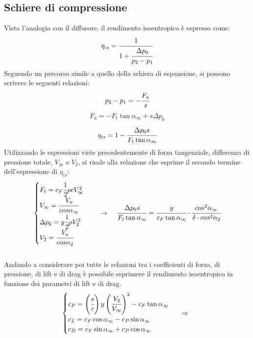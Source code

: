 \subsection{Schiere di compressione}
Vista l'analogia con il diffusore, il rendimento isoentropico è espresso come:
\begin{align*}
\eta_{is} = \cfrac{1}{1 + \cfrac{\Delta p_0}{p_2-p_1}}
\end{align*}
Seguendo un percorso simile a quello della schiera di espansione, si possono scrivere le seguenti relazioni:
\begin{align*}
p_2-p_1 = -\cfrac{F_a}{s}
\end{align*}
\begin{align*}
F_a = -F_t \tan \alpha_{\infty} + s \Delta p_0
\end{align*}
\begin{align*}
\eta_{is} = 1- \cfrac{\Delta p_0 s}{F_t \tan \alpha_{\infty}}
\end{align*}
Utilizzando le espressioni viste precedentemente di forza tangenziale, differenza di pressione totale, $V_\infty$ e $V_2$, si risale alla relazione che esprime il secondo termine dell'espressione di $\eta_{is}$:
\begin{align*}
\begin{cases}
F_t = c_F \cfrac{1}{2} \rho c V_{\infty}^2\\
V_{\infty} = \cfrac{V_a}{cos \alpha_{\infty}}\\
\Delta p_0 = y \cfrac{1}{2} \rho V_2^2\\
V_2 = \cfrac{V_a}{cos \alpha_2}
\end{cases}
\;\;\;\; \rightarrow \;\;\;\;
\cfrac{\Delta p_0 s}{F_t \tan \alpha_{\infty}} = \cfrac{y}{c_F \tan \alpha_{\infty}} \cdot \cfrac{cos^2 \alpha_{\infty}}{\delta \cdot cos^2 \alpha_2}
\end{align*}
\\Andando a considerare poi tutte le relazioni tra i coefficienti di forza, di pressione, di lift e di drag è possibile esprimere il rendimento isoentropico in funzione dei parametri di lift e di drag.
\begin{align*}
\begin{cases}
c_P = \left(  \cfrac{s}{c} \right) y \left( \cfrac{V_2}{V_{\infty}}  \right)^2 - c_F \tan \alpha_{\infty}\\
c_L = c_F \cos \alpha_{\infty} - c_P \sin \alpha_{\infty}\\
c_D = c_F \sin \alpha_{\infty} + c_P \cos \alpha_{\infty}
\end{cases}
\;\; \Rightarrow \;\;
\end{align*}
